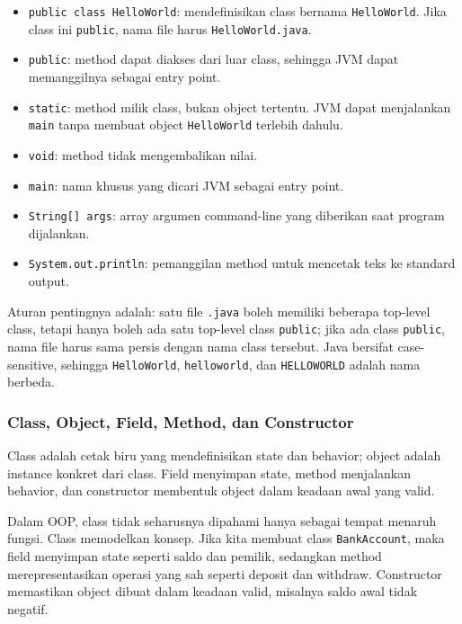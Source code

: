 \begin{itemize}
    \item \texttt{public class HelloWorld}: mendefinisikan class bernama \texttt{HelloWorld}. Jika class ini \texttt{public}, nama file harus \texttt{HelloWorld.java}.
    \item \texttt{public}: method dapat diakses dari luar class, sehingga JVM dapat memanggilnya sebagai entry point.
    \item \texttt{static}: method milik class, bukan object tertentu. JVM dapat menjalankan \texttt{main} tanpa membuat object \texttt{HelloWorld} terlebih dahulu.
    \item \texttt{void}: method tidak mengembalikan nilai.
    \item \texttt{main}: nama khusus yang dicari JVM sebagai entry point.
    \item \texttt{String[] args}: array argumen command-line yang diberikan saat program dijalankan.
    \item \texttt{System.out.println}: pemanggilan method untuk mencetak teks ke standard output.
\end{itemize}

Aturan pentingnya adalah: satu file \texttt{.java} boleh memiliki beberapa top-level class, tetapi hanya boleh ada satu top-level class \texttt{public}; jika ada class \texttt{public}, nama file harus sama persis dengan nama class tersebut. Java bersifat case-sensitive, sehingga \texttt{HelloWorld}, \texttt{helloworld}, dan \texttt{HELLOWORLD} adalah nama berbeda.

\subsubsection{Class, Object, Field, Method, dan Constructor}

\begin{jawab}
Class adalah cetak biru yang mendefinisikan state dan behavior; object adalah instance konkret dari class. Field menyimpan state, method menjalankan behavior, dan constructor membentuk object dalam keadaan awal yang valid.
\end{jawab}

Dalam OOP, class tidak seharusnya dipahami hanya sebagai tempat menaruh fungsi. Class memodelkan konsep. Jika kita membuat class \texttt{BankAccount}, maka field menyimpan state seperti saldo dan pemilik, sedangkan method merepresentasikan operasi yang sah seperti deposit dan withdraw. Constructor memastikan object dibuat dalam keadaan valid, misalnya saldo awal tidak negatif.

